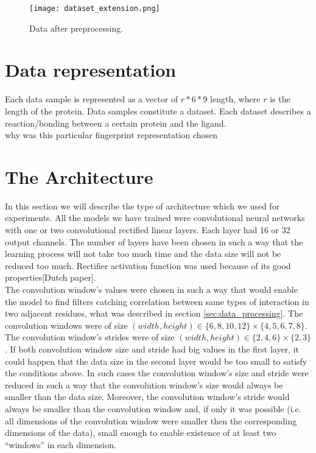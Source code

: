 \documentclass[a4paper,10pt]{report}
\begin{document}
	  \begin{figure}[h!]
	    \centering
	    \texttt{[image: dataset\_extension.png]}
	    \caption{Data after preprocessing.}
	    \label{fig:extended_data}
	  \end{figure}
	  

    
    

    
    \section{Data representation} %
    Each data sample is represented as a vector of $r*6*9$ length, where $r$ is the length of the protein. Data samples constitute a dataset. Each dataset describes a reaction/bonding between a certain protein and the ligand.\\
    
    why was this particular fingerprint representation chosen %
      
	
      \section{The Architecture}
      In this section we will describe the type of architecture which we used for experiments. All the models we have trained were convolutional neural networks with one or two convolutional rectified linear layers. Each layer had 16 or 32 output channels. The number of layers have been chosen in such a way that the learning process will not take too much time and the data size will not be reduced too much. Rectifier activation function was used because of its good properties[Dutch paper].\\ 
   
      The convolution window's values were chosen in such a way that would enable the model to find filters catching correlation between same types of interaction in two adjacent residues, what was described in section \ref{sec:data_processing}. The convolution windows were of size $(width, height) \in \{6, 8, 10, 12\} \times \{4, 5, 6, 7, 8\}$. The convolution window's strides were of size $(width, height) \in \{2, 4, 6\} \times \{2, 3\}$. If both convolution window size and stride had big values in the first layer, it could happen that the data size in the second layer would be too small to satisfy the conditions above. In such cases the convolution window's size and stride were reduced in such a way that the convolution window's size would always be smaller than the data size. Moreover, the convolution window's stride would always be smaller than the convolution window and, if only it was possible (i.e. all dimensions of the convolution window were smaller then the corresponding dimensions of the data), small enough to enable existence of at least two ``windows'' in each dimension.\\
      
\end{document}
